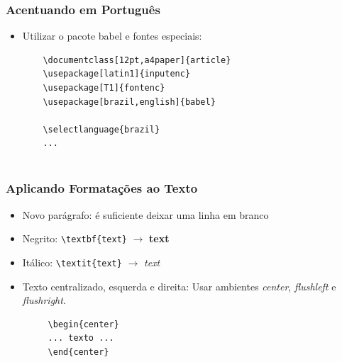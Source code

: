 \begin{frame}[fragile]
\frametitle{Acentuando em Português}

\begin{itemize}
  \item Utilizar o pacote babel e fontes especiais: 
  \begin{verbatim}
  	\documentclass[12pt,a4paper]{article} 
  	\usepackage[latin1]{inputenc}
  	\usepackage[T1]{fontenc} 
  	\usepackage[brazil,english]{babel}
  	 
  	\selectlanguage{brazil}
  	...
  	
  \end{verbatim}
\end{itemize}
 
\end{frame}

\begin{frame}[fragile]
\frametitle{Aplicando Formatações ao Texto}

\begin{itemize}
  \item Novo parágrafo: é suficiente deixar uma linha em branco 
  \item Negrito:  \verb|\textbf{text}| $\rightarrow$ \textbf{text}
  \item Itálico:  \verb|\textit{text}| $\rightarrow$ \textit{text}
  \item Texto centralizado, esquerda e direita: Usar ambientes \textit{center}, \textit{flushleft} e
 \textit{flushright}.
 \begin{verbatim}
     \begin{center}
     ... texto ...
     \end{center}
 \end{verbatim}
\end{itemize}
 
\end{frame}


